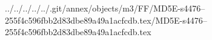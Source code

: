 ../../../../../.git/annex/objects/m3/FF/MD5E-s4476--255f4c596fbb2d83dbe89a49a1acfcdb.tex/MD5E-s4476--255f4c596fbb2d83dbe89a49a1acfcdb.tex